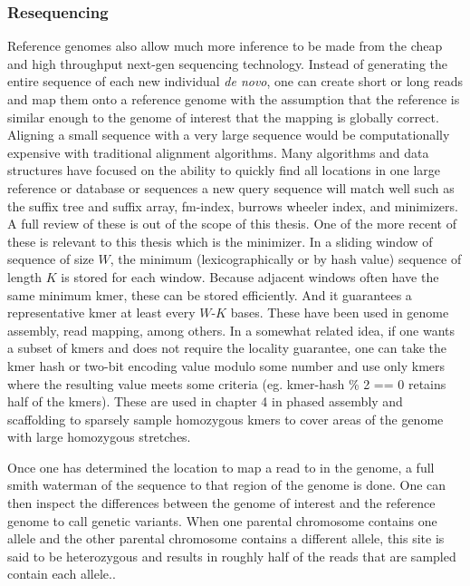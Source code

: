 \subsubsection{Resequencing}

\par{
Reference genomes also allow much more inference to be made from the cheap and high throughput next-gen sequencing technology. Instead of generating the entire sequence of each new individual \textit{de novo}, one can create short or long reads and map them onto a reference genome with the assumption that the reference is similar enough to the genome of interest that the mapping is globally correct. Aligning a small sequence with a very large sequence would be computationally expensive with traditional alignment algorithms\cite{smithwaterman}\cite{needlemanwunsch}. Many algorithms and data structures have focused on the ability to quickly find all locations in one large reference or database or sequences a new query sequence will match well such as the suffix tree and suffix array, fm-index, burrows wheeler index, and minimizers. A full review of these is out of the scope of this thesis\cite{suffixarray}\cite{suffixtree}\cite{fmindex}\cite{fmindex2}\cite{bwa}\cite{blat}. One of the more recent of these is relevant to this thesis which is the minimizer. In a sliding window of sequence of size $W$, the minimum (lexicographically or by hash value) sequence of length $K$ is stored for each window\cite{minimizers}. Because adjacent windows often have the same minimum kmer, these can be stored efficiently. And it guarantees a representative kmer at least every $W$-$K$ bases. These have been used in genome assembly, read mapping, among others\cite{LSH}\cite{minimap2}\cite{mashmap}. In a somewhat related idea, if one wants a subset of kmers and does not require the locality guarantee, one can take the kmer hash or two-bit encoding value modulo some number and use only kmers where the resulting value meets some criteria (eg. kmer-hash \% 2 == 0 retains half of the kmers)\cite{modimizer}. These are used in chapter 4 in phased assembly and scaffolding to sparsely sample homozygous kmers to cover areas of the genome with large homozygous stretches. 
} 

\par{
Once one has determined the location to map a read to in the genome, a full smith waterman of the sequence to that region of the genome is done\cite{smithwaterman}. One can then inspect the differences between the genome of interest and the reference genome to call genetic variants. When one parental chromosome contains one allele and the other parental chromosome contains a different allele, this site is said to be heterozygous and results in roughly half of the reads that are sampled contain each allele.\cite{freebayes}\cite{gatk}.
}

